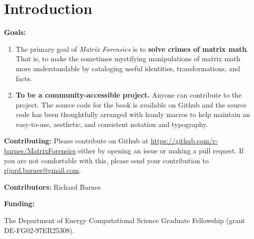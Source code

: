 \chapter{Introduction}

\textbf{Goals:}
\begin{enumerate}
\item The primary goal of \textit{Matrix Forensics} is to \textbf{solve crimes of matrix math}.
That is, to make the sometimes mystifying manipulations of matrix math more understandable by cataloging useful identities, transformations, and facts.

\item \textbf{To be a community-accessible project.} Anyone can contribute to the project. The source code for the book is available on Github and the source code has been thoughtfully arranged with handy macros to help maintain an easy-to-use, aesthetic, and consistent notation and typography.
\end{enumerate}


\textbf{Contributing:}
Please contribute on Github at \url{https://github.com/r-barnes/MatrixForensics} either by opening an issue or making a pull request. If you are not comfortable with this, please send your contribution to \url{rijard.barnes@gmail.com}.


\textbf{Contributors:}
Richard Barnes

\textbf{Funding:}

The Department of Energy Computational Science Graduate Fellowship (grant DE-FG02-97ER25308). %
